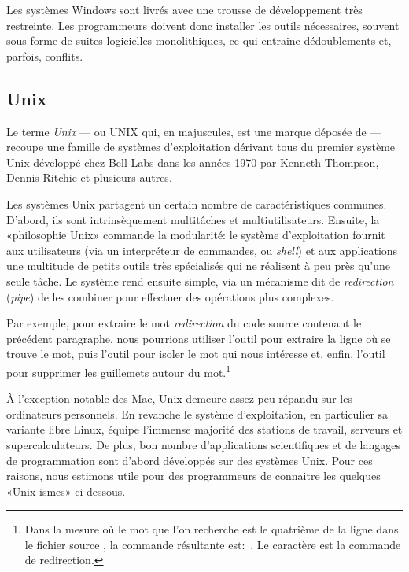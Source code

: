 Les systèmes Windows sont livrés avec une trousse de développement
très restreinte. Les programmeurs doivent donc installer les outils
nécessaires, souvent sous forme de suites logicielles monolithiques,
ce qui entraine dédoublements et, parfois, conflits.

\subsection{Unix}
\label{sec:informatique:os:unix}

Le terme \emph{Unix} --- ou UNIX qui, en majuscules, est
une marque déposée de 
--- recoupe une famille de systèmes d'exploitation dérivant tous du
premier système Unix développé chez Bell Labs dans les années 1970 par
Kenneth Thompson, Dennis Ritchie et plusieurs autres.

Les systèmes Unix partagent un certain nombre de caractéristiques
communes. D'abord, ils sont intrinsèquement multitâches et
multiutilisateurs. Ensuite, la «philosophie Unix» commande la
modularité: le système d'exploitation fournit aux utilisateurs (via un
interpréteur de commandes, ou \emph{shell}) et aux applications une
multitude de petits outils très spécialisés qui ne réalisent à peu
près qu'une seule tâche. Le système rend ensuite simple, via un
mécanisme dit de \emph{redirection} (\emph{pipe}) de les combiner pour
effectuer des opérations plus complexes.

Par exemple, pour extraire le mot \emph{redirection} du code source
contenant le précédent paragraphe, nous pourrions utiliser l'outil
 pour extraire la ligne où se trouve le mot, puis l'outil
 pour isoler le mot qui nous intéresse et, enfin, l'outil
 pour supprimer les guillemets autour du mot.\footnote{%
  Dans la mesure où le mot que l'on recherche est le quatrième de la ligne dans
  le fichier source , la commande résultante
  est:
  \,.
  Le caractère \code{|} est la commande de redirection.}

À l'exception notable des Mac, Unix demeure assez peu répandu sur les
ordinateurs personnels. En revanche le système d'exploitation, en
particulier sa variante libre Linux, équipe l'immense majorité des
stations de travail, serveurs et supercalculateurs. De plus, bon
nombre d'applications scientifiques et de langages de programmation
sont d'abord développés sur des systèmes Unix. Pour ces
raisons, nous estimons utile pour des programmeurs de connaitre les
quelques «Unix-ismes» ci-dessous.

